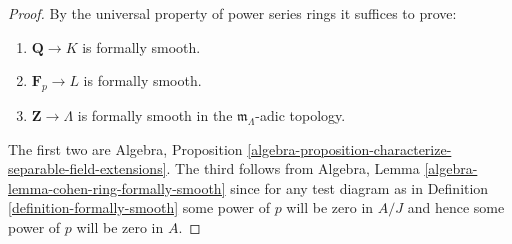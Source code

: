 \documentclass[10pt,a4paper]{amsart}
\theoremstyle{plain}
\theoremstyle{definition}
\theoremstyle{remark}
\numberwithin{equation}{subsection}
\begin{document}
\begin{proof}
By the universal property of power series rings it suffices to prove:
\begin{enumerate}
\item $\mathbf{Q} \to K$ is formally smooth.
\item $\mathbf{F}_p \to L$ is formally smooth.
\item $\mathbf{Z} \to \Lambda$ is formally smooth in the
$\mathfrak m_\Lambda$-adic topology.
\end{enumerate}
The first two are
Algebra, Proposition
\ref{algebra-proposition-characterize-separable-field-extensions}.
The third follows from
Algebra, Lemma \ref{algebra-lemma-cohen-ring-formally-smooth}
since for any test diagram as in Definition \ref{definition-formally-smooth}
some power of $p$ will be zero in $A/J$ and hence some power of $p$ will
be zero in $A$.
\end{proof}
\end{document}

